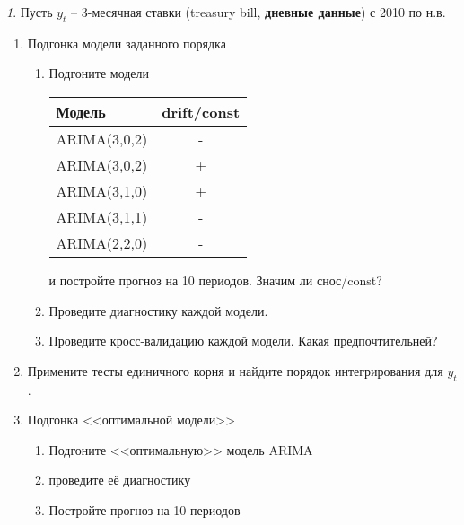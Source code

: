 \documentclass[12pt]{article}
\theoremstyle{remark}
\newtheorem{exercise}{}[subsection]
\begin{document}
\begin{exercise}
Пусть \(y_t\) -- 3-месячная ставки (treasury bill, \textbf{дневные данные}) с 2010 по н.в.
\begin{enumerate}
	\item Подгонка модели заданного порядка
	\begin{enumerate}
		\item Подгоните модели
		\begin{center}
		\begin{tabular}{l|c}
			Модель & drift/const \\ \hline
			ARIMA(3,0,2) & - \\
			ARIMA(3,0,2) & + \\
			ARIMA(3,1,0) & + \\
			ARIMA(3,1,1) & - \\
			ARIMA(2,2,0) & - \\ \hline
		\end{tabular}
		\end{center} 
		и постройте прогноз на 10 периодов. Значим ли снос/const?
		\item Проведите диагностику каждой модели.
		\item Проведите кросс-валидацию каждой модели. Какая предпочтительней?
	\end{enumerate}
	\item Примените тесты единичного корня и найдите порядок интегрирования для \(y_t\). 
	\item Подгонка <<оптимальной модели>>
	\begin{enumerate}
		\item Подгоните <<оптимальную>> модель ARIMA
		\item проведите её диагностику
		\item Постройте прогноз на 10 периодов
	\end{enumerate}
\end{enumerate}
\end{exercise}
\end{document}
